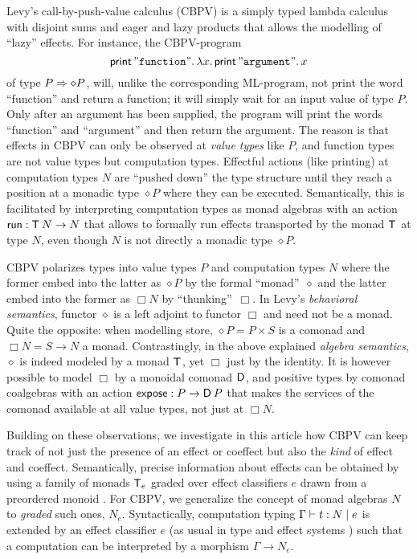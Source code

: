 \documentclass[acmsmall,review,anonymous]{acmart}\settopmatter{printfolios=true,printccs=false,printacmref=false}
\theoremstyle{remark}
\begin{document}
Levy's call-by-push-value calculus (CBPV) \citeyearpar{levy:hosc06}
is a simply typed lambda
calculus with disjoint sums and eager and lazy products that allows
the modelling of ``lazy'' effects.  For instance, the CBPV-program
\[\print {\mathtt{"function"}} \lam x {\print {\mathtt{"argument"}} x}\]
of type $P \To \diamond P$, will, unlike the corresponding ML-program,
not print the word ``function'' and return a function; it will simply
wait for an input value of type $P$.  Only after an argument has been
supplied, the program will print the words ``function'' and
``argument'' and then return the argument.  The reason is that effects
in CBPV can only be observed at \emph{value types} like $P$, and
function types are not value types but computation types.  Effectful
actions (like printing) at computation types $N$ are ``pushed down''
the type structure until they reach a position at a monadic type
$\diamond P$ where they can be executed.  Semantically, this is
facilitated by interpreting computation types as monad algebras with
an action $\trun : \T\,N \to N$ that allows to formally run effects
transported by the monad $\T$ at type $N$, even though $N$ is not
directly a monadic type $\diamond P$.

CBPV polarizes types into value types $P$ and computation types $N$
where the former embed into the latter as $\diamond P$ by the formal
``monad''~$\diamond$ and the latter embed into the former as $\Box N$
by ``thunking''~$\Box$.  In Levy's \emph{behavioral semantics},
functor $\diamond$ is a left adjoint to functor $\Box$ and need not be
a monad.  Quite the opposite: when modelling store,
$\diamond P = P \times S$ is a comonad and $\Box N = S \to N$ a monad.
Contrastingly, in the above explained \emph{algebra semantics},
$\diamond$ is indeed modeled by a monad $\T$, yet $\Box$ just by the
identity.  It is however possible to model $\Box$ by a monoidal
comonad $\D$, and positive types by comonad coalgebras with an action
$\texpose : P \to \D\,P$ that makes the services of the comonad
available at all value types, not just at $\Box N$.

Building on these observations, we investigate in this article how
CBPV %
can
keep track of not just the presence
of an effect or coeffect but also the \emph{kind} of effect and coeffect.
Semantically, precise information about effects can be obtained by
using a family of monads $\T[e]$ graded over effect classifiers $e$
drawn from a preordered monoid \cite{katsumata:popl14}.  For CBPV, we
generalize the concept of monad algebras $N$ to \emph{graded} such
ones, $N_e$.  Syntactically, computation typing $\CompTy \Gamma t e N$
is extended by an effect classifier $e$
(as usual in type and effect systems \citep{nielsen:effect99})
such that a computation can be
interpreted by a morphism $\Gamma \to N_e$.
\end{document}
